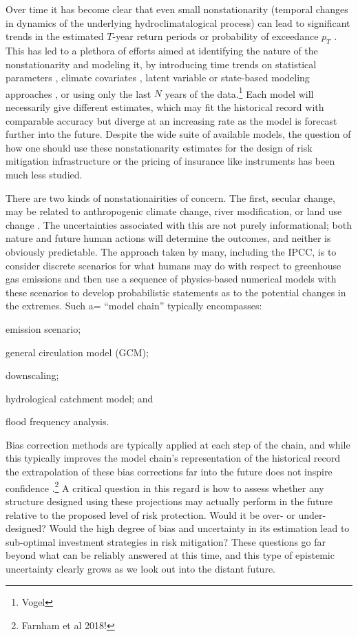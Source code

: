 \documentclass[12pt]{article}
\begin{document}
Over time it has become clear that even small nonstationarity (temporal changes in dynamics of the underlying hydroclimatalogical process) can lead to significant trends in the estimated \(T\)-year return periods or probability of exceedance \( p_T \) \citep{Milly2008,Vogel2011,Salas2014,Merz2014,Obeysekera2016}.
This has led to a plethora of efforts aimed at identifying the nature of the nonstationarity and modeling it, \eg{} by introducing time trends on statistical parameters \citep{Strupczewski2001,Vogel2011,Obeysekera2014,Serinaldi2015}, climate covariates \citep{Delgado2014,Griffis2007,Silva2016,Sun2014,Hall2014}, latent variable or state-based modeling approaches \citep{Griffis2007,Sveinsson2005,Waylen1986}, or using only the last \(N\) years of the data.\footnote{Vogel}
Each model will necessarily give different estimates, which may fit the historical record with comparable accuracy but diverge at an increasing rate as the model is forecast further into the future.
Despite the wide suite of available models, the question of how one should use these nonstationarity estimates for the design of risk mitigation infrastructure or the pricing of insurance like instruments has been much less studied.

There are two kinds of nonstationairities of concern.
The first, secular change, may be related to anthropogenic climate change, river modification, or land use change \citep{Merz2014}.
The uncertainties associated with this are not purely informational; both nature and future human actions will determine the outcomes, and neither is obviously predictable.
The approach taken by many, including the IPCC, is to consider discrete scenarios for what humans may do with respect to greenhouse gas emissions and then use a sequence of physics-based numerical models with these scenarios to develop probabilistic statements as to the potential changes in the extremes.
Such a= ``model chain'' typically encompasses:
\begin{enumerate*}[label= (\roman*) ]
  \item emission scenario;
  \item general circulation model (GCM);
  \item downscaling;
  \item hydrological catchment model; and
  \item flood frequency analysis.
\end{enumerate*}
Bias correction methods are typically applied at each step of the chain, and while this typically improves the model chain's representation of the historical record the extrapolation of these bias corrections far into the future does not inspire confidence \citep{Dankers2009,Ott2013,Merz2014,Dittes2017}.\footnote{Farnham et al 2018!}
A critical question in this regard is how to assess whether any structure designed using these projections may actually perform in the future relative to the proposed level of risk protection.
Would it be over- or under- designed?
Would the high degree of bias and uncertainty in its estimation lead to sub-optimal investment strategies in risk mitigation?
These questions go far beyond what can be reliably answered at this time, and this type of epistemic uncertainty clearly grows as we look out into the distant future.
\end{document}
